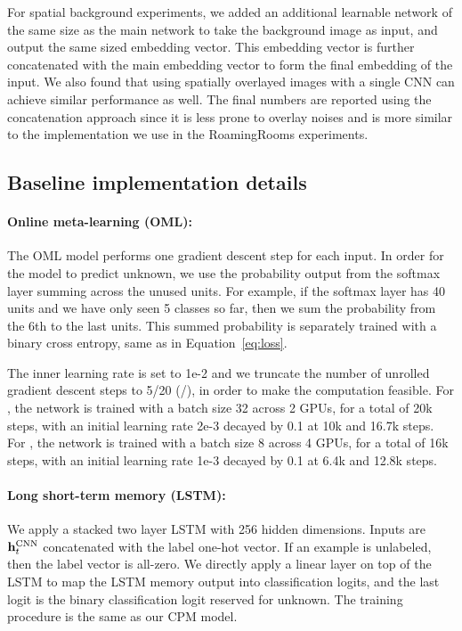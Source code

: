 For spatial background experiments, we added an additional learnable network of the same size as the main network to take the background image as input, and output the same sized embedding vector. This embedding vector is further concatenated with the main embedding vector to form the final embedding of the input. We also found that using spatially overlayed images with a single CNN can achieve similar performance as well. The final numbers are reported using the concatenation approach since it is less prone to overlay noises and is more similar to the implementation we use in the RoamingRooms experiments.



\subsection{Baseline implementation details}
\paragraph{Online meta-learning (OML):} The OML  model performs one gradient descent step for each
input. In order for the model to predict unknown, we use the probability output from the softmax
layer summing across the unused units. For example, if the softmax layer has 40 units and we have
only seen 5 classes so far, then we sum the probability from the 6th to the last units. This summed
probability is separately trained with a binary cross entropy, same as in Equation~\ref{eq:loss}.

The inner learning rate is set to 1e-2 and we truncate the number of unrolled gradient descent steps
to 5/20 (\ourchar{}/\ourroom{}), in order to make the computation feasible. For \ourchar{}, the
network is trained with a batch size 32 across 2 GPUs, for a total of 20k steps, with an initial
learning rate 2e-3 decayed by 0.1 at 10k and 16.7k steps. For \ourroom{}, the network is trained
with a batch size 8 across 4 GPUs, for a total of 16k steps, with an initial learning rate 1e-3
decayed by 0.1 at 6.4k and 12.8k steps.

\paragraph{Long short-term memory (LSTM):} We apply a stacked two layer LSTM with 256 hidden
dimensions. Inputs are $\mathbf{h}_t^{\text{CNN}}$ concatenated with the label one-hot vector. If an
example is unlabeled, then the label vector is all-zero. We directly apply a linear layer on top of
the LSTM to map the LSTM memory output into classification logits, and the last logit is the binary
classification logit reserved for unknown. The training procedure is the same as our CPM model.

